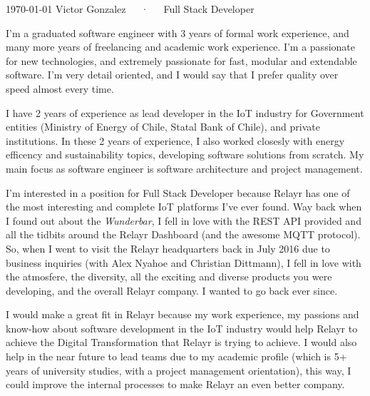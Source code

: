 \documentclass[11pt, letterpaper]{awesome-cv}
\begin{document}
\makecvheader[C]

\makecvfooter
  {\today}
  {Victor Gonzalez~~~·~~~Full Stack Developer}
  {}

\makelettertitle

\begin{cvletter}

I'm a graduated software engineer with 3 years of formal work experience, and many more years of freelancing and academic work experience. I'm a passionate for new technologies, and extremely passionate for fast, modular and extendable software. I'm very detail oriented, and I would say that I prefer quality over speed almost every time.

I have 2 years of experience as lead developer in the IoT industry for Government entities (Ministry of Energy of Chile, Statal Bank of Chile), and private institutions. In these 2 years of experience, I also worked closesly with energy efficency and sustainability topics, developing software solutions from scratch. My main focus as software engineer is software architecture and project management.

I'm interested in a position for Full Stack Developer because Relayr has one of the most interesting and complete IoT platforms I've ever found. Way back when I found out about the \emph{Wunderbar}, I fell in love with the REST API provided and all the tidbits around the Relayr Dashboard (and the awesome MQTT protocol). So, when I went to visit the Relayr headquarters back in July 2016 due to business inquiries (with Alex Nyahoe and Christian Dittmann), I fell in love with the atmosfere, the diversity, all the exciting and diverse products you were developing, and the overall Relayr company. I wanted to go back ever since.

I would make a great fit in Relayr because my work experience, my passions and know-how about software development in the IoT industry would help Relayr to achieve the Digital Transformation that Relayr is trying to achieve. I would also help in the near future to lead teams due to my academic profile (which is 5+ years of university studies, with a project management orientation), this way, I could improve the internal processes to make Relayr an even better company. 

\end{cvletter}


\makeletterclosing
\end{document}
